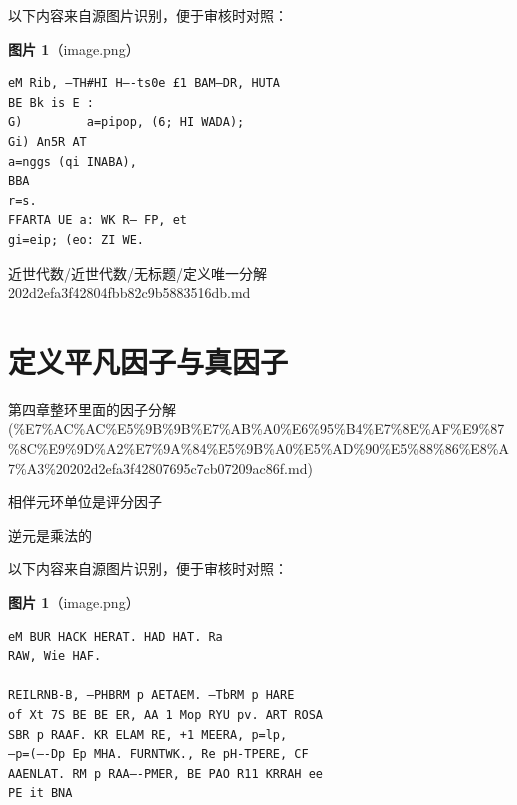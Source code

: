 \begin{note}
以下内容来自源图片识别，便于审核时对照：

\textbf{图片 1}（image.png）
\begin{Verbatim}[fontsize=\small]
eM Rib, —TH#HI H—-ts0e £1 BAM—DR, HUTA
BE Bk is E :
G)         a=pipop, (6; HI WADA);
Gi) An5R AT
a=nggs (qi INABA),
BBA
r=s.
FFARTA UE a: WK R— FP, et
gi=eip; (eo: ZI WE.
\end{Verbatim}

\end{note}

\begin{note}[来源路径]

近世代数/近世代数/无标题/定义唯一分解 202d2efa3f42804fbb82c9b5883516db.md

\end{note}

\section*{定义平凡因子与真因子}

\begin{note}[来源上级主题]

第四章整环里面的因子分解 (\%E7\%AC\%AC\%E5\%9B\%9B\%E7\%AB\%A0\%E6\%95\%B4\%E7\%8E\%AF\%E9\%87\%8C\%E9\%9D\%A2\%E7\%9A\%84\%E5\%9B\%A0\%E5\%AD\%90\%E5\%88\%86\%E8\%A7\%A3\%20202d2efa3f42807695c7cb07209ac86f.md)

\end{note}

\begin{definition}[定义平凡因子与真因子]

相伴元环单位是评分因子

逆元是乘法的

\end{definition}

\begin{note}
以下内容来自源图片识别，便于审核时对照：

\textbf{图片 1}（image.png）
\begin{Verbatim}[fontsize=\small]
eM BUR HACK HERAT. HAD HAT. Ra
RAW, Wie HAF.

REILRNB-B, —PHBRM p AETAEM. —TbRM p HARE
of Xt 7S BE BE ER, AA 1 Mop RYU pv. ART ROSA
SBR p RAAF. KR ELAM RE, +1 MEERA, p=lp,
—p=(—-Dp Ep MHA. FURNTWK., Re pH-TPERE, CF
AAENLAT. RM p RAA—-PMER, BE PAO R11 KRRAH ee
PE it BNA
\end{Verbatim}

\end{note}

